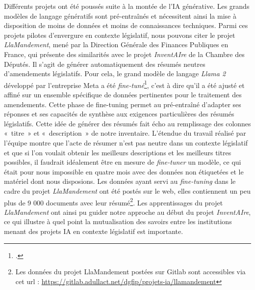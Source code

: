Différents projets ont été poussés suite à la montée de l'IA générative. Les grands modèles de
langage génératifs sont pré-entraînés et nécessitent ainsi la mise à disposition de moins de
données et moins de connaissances techniques. Parmi ces projets pilotes d'envergure en contexte législatif, nous pouvons citer le projet
\emph{LlaMandement}, mené par la Direction Générale des Finances Publiques en France, qui présente des
similarités avec le projet \emph{InventAIre} de la Chambre des Députés.
Il s'agit de générer automatiquement des résumés neutres d'amendements
législatifs. Pour cela, le grand modèle de langage \emph{Llama 2}
développé par l'entreprise Meta a été
\emph{fine-tuné}\footcite{gesnouin_llamandement_2024}, c'est à dire qu'il a été
ajusté et affiné sur un ensemble spécifique de données pertinentes pour
le traitement des amendements. Cette phase de \gls{fine-tuning} permet
au \gls{pré-entraîné} d'adapter ses réponses et ses capacités de synthèse aux exigences
particulières des résumés législatifs. Cette idée de générer des résumés
fait écho au remplissage des colonnes «~titre~» et «~description~» de
notre inventaire. L'étendue du travail réalisé par l'équipe montre que
l'acte de résumer n'est pas neutre dans un contexte législatif et que si
l'on voulait obtenir les meilleurs descriptions et les meilleurs titres
possibles, il faudrait idéalement être en mesure de \emph{fine-tuner} un
modèle, ce qui était pour nous impossible en quatre mois avec des
données non étiquetées et le matériel dont nous disposions. Les données ayant servi au \emph{fine-tuning} dans
le cadre du projet \emph{LlaMandement} ont été postés sur le web, elles
contiennent un peu plus de 9 000 documents avec leur résumé\footnote{Les données
	du projet LlaMandement postées sur Gitlab sont accessibles via cet url :
	\url{https://gitlab.adullact.net/dgfip/projets-ia/llamandement}}. Les
apprentissages du projet \emph{LlaMandement} ont ainsi pu guider notre
approche au début du projet \emph{InventAIre}, ce qui illustre à quel
point la mutualisation des savoirs entre les institutions
menant des projets IA en contexte législatif est importante.

